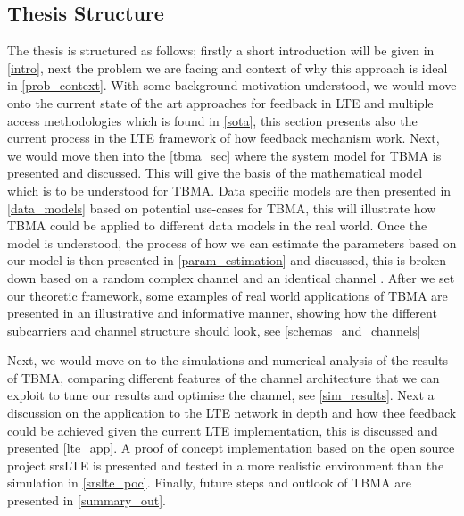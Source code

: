 \documentclass{article}
\begin{document}
\subsection{Thesis Structure }
The thesis is structured as follows; firstly a short introduction will be given in \cref{intro}, next the problem we are facing and context of why this approach is ideal in \cref{prob_context}. With some background motivation understood, we would move onto the current state of the art approaches for feedback in LTE and multiple access methodologies which is found in \cref{sota}, this section presents also the current process in the LTE framework of how feedback mechanism work. Next, we would move then into the \cref{tbma_sec} where the system model for TBMA is presented and discussed. This will give the basis of the mathematical model which is to be understood for TBMA. Data specific models are then presented in \cref{data_models} based on potential use-cases for TBMA, this will illustrate how TBMA could be applied to different data models in the real world. Once the model is understood, the process of how we can estimate the parameters based on our model is then presented in \cref{param_estimation} and discussed, this is broken down based on a random complex channel and an identical channel \cite{tbma}. After we set our theoretic framework, some examples of real world applications of TBMA are presented in an illustrative and informative manner, showing how the different subcarriers and channel structure should look, see \cref{schemas_and_channels}

Next, we would move on to the simulations and numerical analysis of the results of TBMA, comparing different features of the channel architecture that we can exploit to tune our results and optimise the channel, see \cref{sim_results}. Next a discussion on the application to the LTE network in depth and how thee feedback could be achieved given the current LTE implementation, this is discussed and presented \cref{lte_app}. A proof of concept implementation based on the open source project srsLTE is presented and tested in a more realistic environment than the simulation in \cref{srslte_poc}. Finally, future steps and outlook of TBMA are presented in \cref{summary_out}. 
\end{document}
